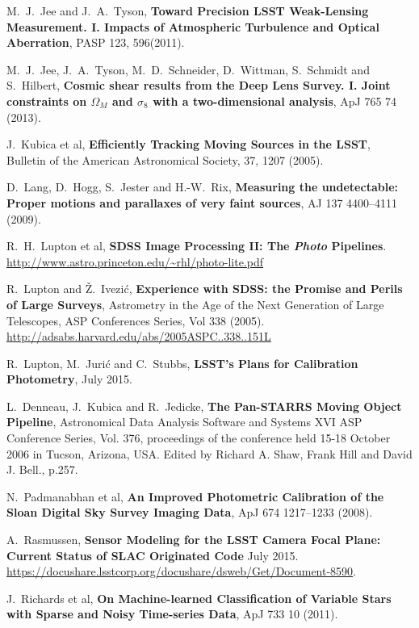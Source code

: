 \documentclass[12pt]{article}
\begin{document}
\begin{thebibliography}{10}
 M.~J.~Jee and J.~A.~Tyson,  \textbf{Toward
  Precision LSST Weak-Lensing Measurement. I. Impacts of Atmospheric
  Turbulence and Optical Aberration}, PASP 123, 596(2011).

 M.~J.~Jee, J.~A.~Tyson, M.~D.~Schneider, D.~Wittman, S.~Schmidt and S.~Hilbert,
  \textbf{Cosmic shear results from the Deep Lens Survey. I. Joint constraints on $\Omega_M$ and $\sigma_8$ with a two-dimensional analysis},
  ApJ 765 74 (2013).

 J.~Kubica et al,
  \textbf{Efficiently Tracking Moving Sources in the LSST},
  Bulletin of the American Astronomical Society, 37, 1207 (2005).

 D.~Lang, D.~Hogg, S.~Jester and H.-W.~Rix,
  \textbf{Measuring the undetectable: Proper motions and parallaxes of very faint sources},
  AJ 137 4400--4111 (2009).

 R.~H.~Lupton et al,
  \textbf{SDSS Image Processing II: The \textit{Photo} Pipelines}.
  \url{http://www.astro.princeton.edu/~rhl/photo-lite.pdf}

 R.~Lupton and \v{Z}.~Ivezi\'c, \textbf{Experience with SDSS: the Promise and Perils of Large Surveys},
  Astrometry in the Age of the Next Generation of Large Telescopes, ASP
  Conferences Series, Vol 338 (2005). \url{http://adsabs.harvard.edu/abs/2005ASPC..338..151L}

 R.~Lupton, M.~Juri\'c and C.~Stubbs,
  \textbf{LSST's Plans for Calibration Photometry},
  July 2015.

 L.~Denneau, J.~Kubica and R.~Jedicke,
   \textbf{The Pan-STARRS Moving Object Pipeline}, Astronomical Data
  Analysis Software and Systems XVI ASP Conference Series, Vol. 376,
  proceedings of the conference held 15-18 October 2006 in Tucson,
  Arizona, USA\@. Edited by Richard A. Shaw, Frank Hill and David
  J. Bell., p.257.

 N.~Padmanabhan et al,
  \textbf{An Improved Photometric Calibration of the Sloan Digital Sky Survey Imaging Data},
  ApJ 674 1217--1233 (2008).

 A.~Rasmussen,
  \textbf{Sensor Modeling for the LSST Camera Focal Plane: Current Status of SLAC Originated Code}
  July 2015. \url{https://docushare.lsstcorp.org/docushare/dsweb/Get/Document-8590}.

 J.~Richards et al,
  \textbf{On Machine-learned Classification of Variable Stars with Sparse and Noisy Time-series Data},
  ApJ 733 10 (2011).


\end{thebibliography}
\end{document}
